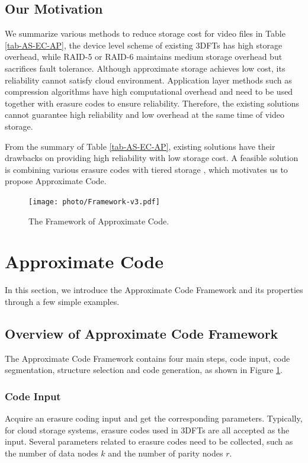 \documentclass[sigconf]{acmart}
\begin{document}
\subsection{Our Motivation}
We summarize various methods to reduce storage cost for video files in Table \ref{tab-AS-EC-AP}, the device level scheme of existing 3DFTs has high storage overhead, while RAID-5 or RAID-6 maintains medium storage overhead but sacrifices fault tolerance. Although approximate storage achieves low cost, its reliability cannot satisfy cloud environment. Application layer methods such as compression algorithms have high computational overhead and need to be used together with erasure codes to ensure reliability.
Therefore, the existing solutions cannot guarantee high reliability and low overhead at the same time of video storage.

From the summary of Table \ref{tab-AS-EC-AP}, existing solutions have their drawbacks on providing high reliability with low storage cost. 
A feasible solution is combining various erasure codes with tiered storage \cite{krish2014hats} \cite{wang2014balancing} \cite{zhang2010automated} \cite{udipi2012lot}, which motivates us to propose Approximate Code.

\begin{figure}[ht]
\centering
\texttt{[image: photo/Framework-v3.pdf]}
\caption{The Framework of Approximate Code.}\label{fig-framework}
\end{figure}

\section{Approximate Code}\label{ApCode}
In this section, we introduce the Approximate Code Framework and its properties through a few simple examples.

\subsection{Overview of Approximate Code Framework}
The Approximate Code Framework contains four main steps, code input, code segmentation, structure selection and code generation, as shown in Figure \ref{fig-framework}.

\subsubsection{Code Input}
Acquire an erasure coding input and get the corresponding parameters. Typically, for cloud storage systems, erasure codes used in 3DFTs are all accepted as the input. Several parameters related to erasure codes need to be collected, such as the number of data nodes $k$ and the number of parity nodes $r$.
\end{document}
